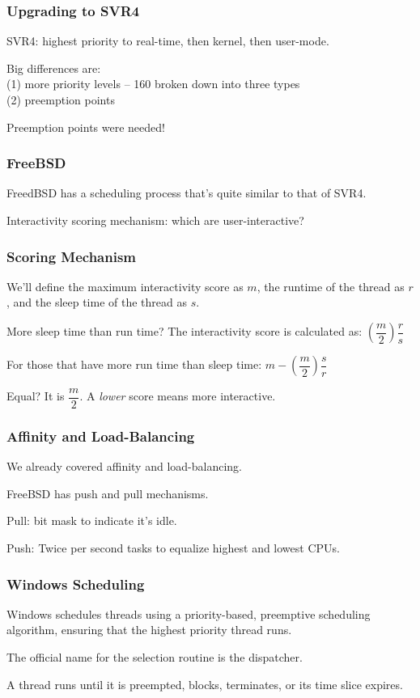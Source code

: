 \begin{frame}
\frametitle{Upgrading to SVR4}

SVR4: highest priority to real-time, then kernel, then user-mode.

Big differences are:\\
\quad (1) more priority levels -- 160 broken down into three types\\
\quad (2) preemption points

Preemption points were needed!

\end{frame}

\begin{frame}
\frametitle{FreeBSD}
FreedBSD has a scheduling process that's quite similar to that of SVR4.

Interactivity scoring mechanism: which are user-interactive?

\end{frame}

\begin{frame}
\frametitle{Scoring Mechanism}

We'll define the maximum interactivity score as $m$, the runtime of the thread as $r$, and the sleep time of the thread as $s$. 

More sleep time than run time? The interactivity score is calculated as: $\left(\dfrac{m}{2}\right)\dfrac{r}{s}$

For those that have more run time than sleep time: $m - \left(\dfrac{m}{2}\right)\dfrac{s}{r}$

Equal? It is $\dfrac{m}{2}$. A \textit{lower} score means more interactive.

\end{frame}

\begin{frame}
\frametitle{Affinity and Load-Balancing}

We already covered affinity and load-balancing.

FreeBSD has push and pull mechanisms.

Pull: bit mask to indicate it's idle.

Push: Twice per second tasks to equalize highest and lowest CPUs.


\end{frame}

\begin{frame}
\frametitle{Windows Scheduling}

Windows schedules threads using a priority-based, preemptive scheduling algorithm, ensuring that the highest priority thread runs. 

The official name for the selection routine is the \alert{dispatcher}.

A thread runs until it is preempted, blocks, terminates, or its time slice expires. 

\end{frame}

